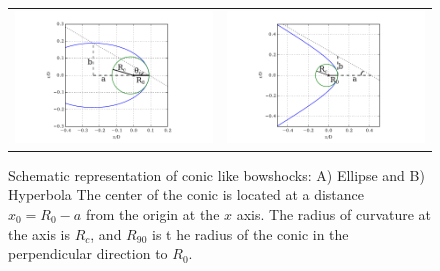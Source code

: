 \begin{figure}
\setlength\tabcolsep{0pt}
\begin{tabular}{cc}
\includegraphics[height=0.44\linewidth, trim=30 0 30 0, clip]{ellipse_py_lab} &
\includegraphics[height=0.44\linewidth, trim=60 0 70 0, clip]{hyperbola_py_lab}
\end{tabular}
\label{fig:conics}
\caption{Schematic representation of conic like bowshocks: A) Ellipse and B) Hyperbola The center of the conic is located at a distance $x_0=R_0-a$ from the origin at the $x$ axis. 
The radius of curvature at the axis is $R_c$, and $R_{90}$ is t he radius of the conic in the perpendicular direction to $R_0$.
}
\end{figure}
